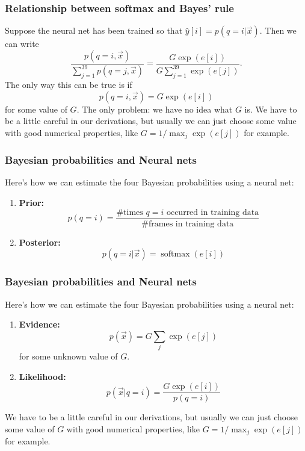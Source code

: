 \documentclass{beamer}
\DeclareMathOperator*{\softmax}{softmax}
\begin{document}
\begin{frame}
  \frametitle{Relationship between softmax and Bayes' rule}

  Suppose the neural net has been trained so that
  $\hat{y}[i]=p(q=i|\vec{x})$.  Then we can write
  \begin{displaymath}
    \frac{p(q=i,\vec{x})}{\sum_{j=1}^{39} p(q=j,\vec{x})} =
    \frac{G\exp(e[i])}{G\sum_{j=1}^{39} \exp(e[j])}.
  \end{displaymath}
  The only way this can be true is if
  \begin{displaymath}
    p(q=i,\vec{x}) = G\exp(e[i])
  \end{displaymath}
  for some value of $G$.  The only problem: we have no idea what $G$
  is.  We have to be a little careful in our derivations, but usually
  we can just choose some value with good numerical properties, like
  $G=1/\max_j \exp(e[j])$ for example.
\end{frame}

\begin{frame}
  \frametitle{Bayesian probabilities and Neural nets}
  Here's how we can estimate the four Bayesian probabilities using a neural net:
  \begin{enumerate}
  \item {\bf Prior:}
    \begin{displaymath}
      p(q=i) = \frac{\mbox{\# times $q=i$ occurred in training data}}{\mbox{\# frames in training data}}
    \end{displaymath}
  \item {\bf Posterior:}
    \begin{displaymath}
      p(q=i|\vec{x}) = \softmax\left(e[i]\right)
    \end{displaymath}
  \end{enumerate}
\end{frame}

    
\begin{frame}
  \frametitle{Bayesian probabilities and Neural nets}
  Here's how we can estimate the four Bayesian probabilities using a neural net:
  \begin{enumerate}
  \item {\bf Evidence:}
    \begin{displaymath}
      p(\vec{x}) = G\sum_j\exp(e[j])
    \end{displaymath}
    for some unknown value of $G$.
  \item {\bf Likelihood:}
    \begin{displaymath}
      p(\vec{x}|q=i) = \frac{G\exp(e[i])}{p(q=i)}
    \end{displaymath}
  \end{enumerate}
  We have to be a little careful in our derivations, but usually we
  can just choose some value of $G$ with good numerical properties,
  like $G=1/\max_j \exp(e[j])$ for example.
\end{frame}
\end{document}
